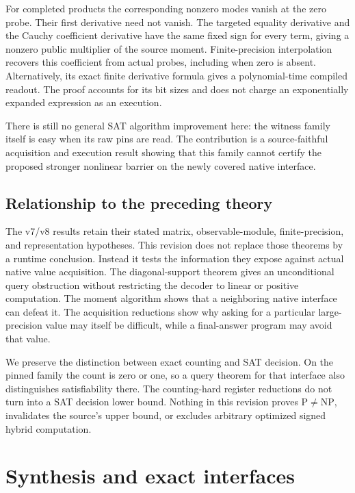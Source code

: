 \documentclass[11pt,a4paper]{article}
\begin{document}
For completed products the corresponding nonzero modes vanish at the
zero probe. Their first derivative need not vanish. The targeted
equality derivative and the Cauchy coefficient derivative have the same
fixed sign for every term, giving a nonzero public multiplier of the
source moment. Finite-precision interpolation recovers this coefficient
from actual probes, including when zero is absent. Alternatively, its
exact finite derivative formula gives a polynomial-time compiled
readout. The proof accounts for its bit sizes and does not charge an
exponentially expanded expression as an execution.

There is still no general SAT algorithm improvement here: the witness
family itself is easy when its raw pins are read. The contribution is a
source-faithful acquisition and execution result showing that this
family cannot certify the proposed stronger nonlinear barrier on the
newly covered native interface.

\subsection{Relationship to the preceding
theory}\label{v9-relationship-to-the-preceding-theory}

The v7/v8 results retain their stated matrix, observable-module,
finite-precision, and representation hypotheses. This revision does not
replace those theorems by a runtime conclusion. Instead it tests the
information they expose against actual native value acquisition. The
diagonal-support theorem gives an unconditional query obstruction
without restricting the decoder to linear or positive computation. The
moment algorithm shows that a neighboring native interface can defeat
it. The acquisition reductions show why asking for a particular
large-precision value may itself be difficult, while a final-answer
program may avoid that value.

We preserve the distinction between exact counting and SAT decision. On
the pinned family the count is zero or one, so a query theorem for that
interface also distinguishes satisfiability there. The counting-hard
register reductions do not turn into a SAT decision lower bound. Nothing
in this revision proves \(\mathrm P\ne\mathrm{NP}\), invalidates the
source's upper bound, or excludes arbitrary optimized signed hybrid
computation.

\section{Synthesis and exact interfaces}\label{v9-section-synthesis}
\end{document}
